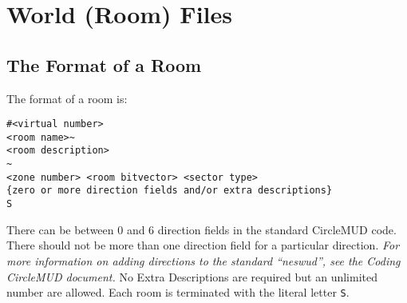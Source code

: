 \documentclass[11pt]{article}
\begin{document}
\section{World (Room) Files}
\subsection{The Format of a Room}
The format of a room is:
\begin{verbatim}
#<virtual number>
<room name>~
<room description>
~
<zone number> <room bitvector> <sector type>
{zero or more direction fields and/or extra descriptions}
S
\end{verbatim}

There can be between 0 and 6 direction fields in the standard CircleMUD code.  There should not be more than one direction field for a particular direction.  {\it For more information on adding directions to the standard ``neswud'', see the Coding CircleMUD document.} No Extra Descriptions are required but an unlimited number are allowed.  Each room is terminated with the literal letter \texttt{S}.
\end{document}
